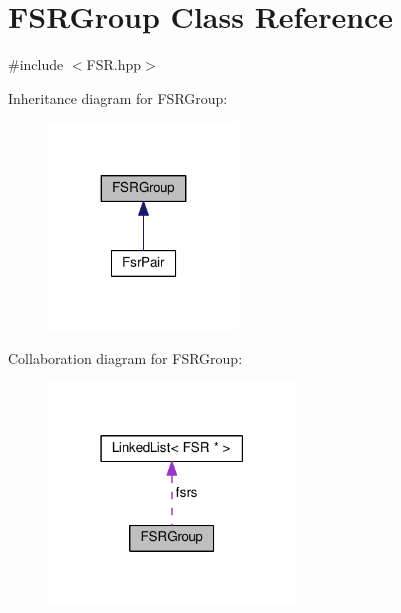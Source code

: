 \hypertarget{classFSRGroup}{}\section{F\+S\+R\+Group Class Reference}
\label{classFSRGroup}


{\ttfamily \#include $<$F\+S\+R.\+hpp$>$}



Inheritance diagram for F\+S\+R\+Group\+:\nopagebreak
\begin{figure}[H]
\begin{center}
\leavevmode
\includegraphics[width=143pt]{classFSRGroup__inherit__graph}
\end{center}
\end{figure}


Collaboration diagram for F\+S\+R\+Group\+:
\nopagebreak
\begin{figure}[H]
\begin{center}
\leavevmode
\includegraphics[width=186pt]{classFSRGroup__coll__graph}
\end{center}
\end{figure}
